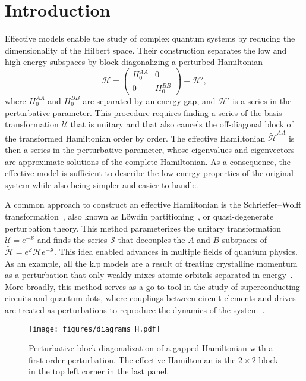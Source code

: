 \section{Introduction}

Effective models enable the study of complex quantum systems by reducing the
dimensionality of the Hilbert space.
Their construction separates the low and high energy subspaces by
block-diagonalizing a perturbed Hamiltonian
%
\begin{equation}
    \mathcal{H} = \begin{pmatrix}H_0^{AA} & 0 \\ 0 & H_0^{BB}\end{pmatrix} + \mathcal{H}',
\end{equation}
%
where $H_0^{AA}$ and $H_0^{BB}$ are separated by an energy gap, and
$\mathcal{H}'$ is a series in the perturbative parameter.
This procedure requires finding a series of the basis transformation
$\mathcal{U}$ that is unitary and that also cancels the off-diagonal block of
the transformed Hamiltonian order by order.
The effective Hamiltonian $\tilde{\mathcal{H}}^{AA}$ is then a series in the
perturbative parameter, whose eigenvalues and eigenvectors are approximate
solutions of the complete Hamiltonian.
As a consequence, the effective model is sufficient to describe the low energy
properties of the original system while also being simpler and easier to
handle.

A common approach to construct an effective Hamiltonian is the
Schrieffer--Wolff transformation~\cite{Schrieffer_1966,Bravyi_2011}, also known
as Löwdin partitioning~\cite{White_1950}, or quasi-degenerate perturbation
theory.
This method parameterizes the unitary transformation $\mathcal{U} =
e^{-\mathcal{S}}$ and finds the series $\mathcal{S}$ that decouples the $A$ and
$B$ subspaces of $\tilde{\mathcal{H}} =
e^{\mathcal{S}}\mathcal{H}e^{-\mathcal{S}}$.
This idea enabled advances in multiple fields of quantum physics.
As an example, all the k.p models are a result of treating crystalline momentum
as a perturbation that only weakly mixes atomic orbitals separated in
energy~\cite{Luttinger_1955}.
More broadly, this method serves as a go-to tool in the study of
superconducting circuits and quantum dots, where couplings between circuit
elements and drives are treated as perturbations to reproduce the dynamics
of the system~\cite{Krantz_2019,Romhanyi_2015}.
%
\begin{figure}[h!]
    \centering
    \texttt{[image: figures/diagrams\_H.pdf]}
    \caption{
      Perturbative block-diagonalization of a gapped Hamiltonian with a first order
      perturbation.
      The effective Hamiltonian is the $2\times 2$ block in the top left corner in
      the last panel.
    }
    \label{fig:block_diagonalization}
\end{figure}

